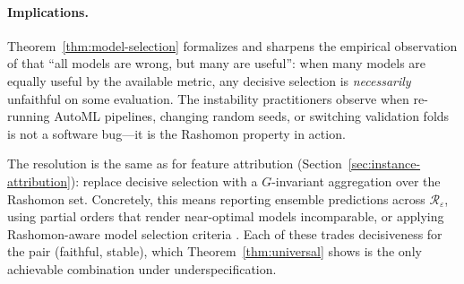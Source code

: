 \paragraph{Implications.}
Theorem~\ref{thm:model-selection} formalizes and sharpens the empirical
observation of \citet{fisher2019models} that ``all models are wrong, but
many are useful'': when many models are equally useful by the available
metric, any decisive selection is \emph{necessarily} unfaithful on some
evaluation.  The instability practitioners observe when re-running
AutoML pipelines, changing random seeds, or switching validation folds
is not a software bug---it is the Rashomon property in action.

The resolution is the same as for feature attribution
(Section~\ref{sec:instance-attribution}): replace decisive selection
with a $G$-invariant aggregation over the Rashomon set.  Concretely,
this means reporting ensemble predictions across $\mathcal{R}_\varepsilon$,
using partial orders that render near-optimal models incomparable, or
applying Rashomon-aware model selection criteria
\citep{semenova2022existence,herren2023statistical}.  Each of these
trades decisiveness for the pair (faithful, stable), which
Theorem~\ref{thm:universal} shows is the only achievable combination
under underspecification.
